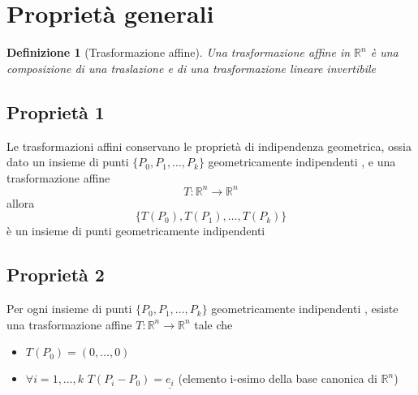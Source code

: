 \documentclass[a4paper]{report}
\newtheorem{definition}{Definizione}
\newcommand{\R}{\ensuremath{\mathbb{R}}}
\newcommand{\ra}{\ensuremath{\rightarrow}}
\newcommand{\geoind}[1]{geometricamente indipendent{#1} }
\newcommand{\pointset}{\ensuremath{\{P_0,P_1,\dots,P_k\}} }
\begin{document}
\section{Proprietà generali}
\begin{definition}[Trasformazione affine]
    Una trasformazione affine in $\R^n$ è una composizione di una traslazione e di una trasformazione lineare invertibile
\end{definition}
\subsection{Proprietà 1}
Le trasformazioni affini conservano le proprietà di indipendenza geometrica, ossia dato un insieme di punti \pointset \geoind{i}, e una trasformazione affine
\[
    T:\R^n\ra\R^n
\]
allora
\[
    \{T(P_0),T(P_1),\dots,T(P_k)\}
\]
è un insieme di punti \geoind{i}
\subsection{Proprietà 2}
Per ogni insieme di punti \pointset \geoind{i}, esiste una trasformazione affine $T:\R^n\ra\R^n$ tale che
\begin{itemize}
    \item $T(P_0)=(0,\dots,0)$
    \item $\forall i=1,\dots,k$ $T(P_i-P_0)=\underline{e_i}$ (elemento i-esimo della base canonica di $\R^n$)
\end{itemize}
\end{document}
